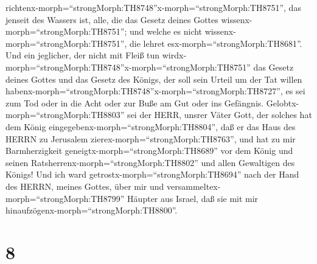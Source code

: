 richtenx-morph=``strongMorph:TH8748''x-morph=``strongMorph:TH8751'', das
jenseit des Wassers ist, alle, die das Gesetz deines Gottes
wissenx-morph=``strongMorph:TH8751''; und welche es nicht
wissenx-morph=``strongMorph:TH8751'', die lehret
esx-morph=``strongMorph:TH8681''.  Und ein jeglicher, der
nicht mit Fleiß tun
wirdx-morph=``strongMorph:TH8748''x-morph=``strongMorph:TH8751'' das
Gesetz deines Gottes und das Gesetz des Königs, der soll sein Urteil um
der Tat willen
habenx-morph=``strongMorph:TH8748''x-morph=``strongMorph:TH8727'', es
sei zum Tod oder in die Acht oder zur Buße am Gut oder ins Gefängnis.
 Gelobtx-morph=``strongMorph:TH8803'' sei der HERR, unsrer
Väter Gott, der solches hat dem König
eingegebenx-morph=``strongMorph:TH8804'', daß er das Haus des HERRN zu
Jerusalem zierex-morph=``strongMorph:TH8763'',  und hat zu
mir Barmherzigkeit geneigtx-morph=``strongMorph:TH8689'' vor dem König
und seinen Ratsherrenx-morph=``strongMorph:TH8802'' und allen Gewaltigen
des Königs! Und ich ward getrostx-morph=``strongMorph:TH8694'' nach der
Hand des HERRN, meines Gottes, über mir und
versammeltex-morph=``strongMorph:TH8799'' Häupter aus Israel, daß sie
mit mir hinaufzögenx-morph=``strongMorph:TH8800''.

\hypertarget{section-7}{%
\section{8}\label{section-7}}


